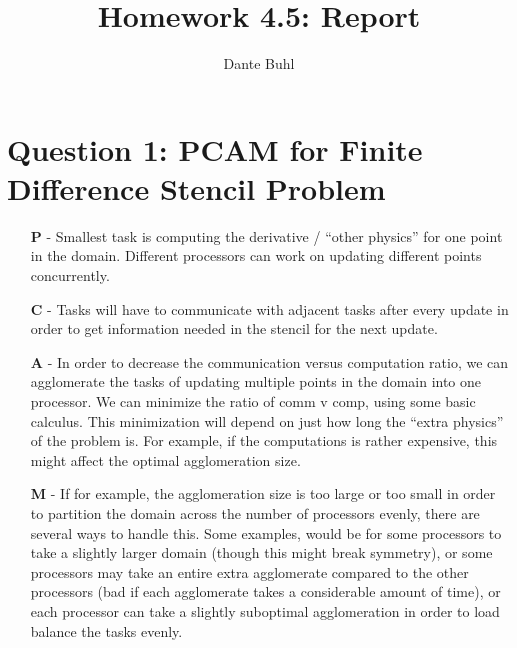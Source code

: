 \documentclass{article}
\title{Homework 4.5: Report}
\author{Dante Buhl}
\begin{document}
\newcommand{\bs}[1]{\boldsymbol{#1}}
\newcommand{\bmp}[1]{\begin{minipage}{#1\textwidth}}
\newcommand{\emp}{\end{minipage}}
\newcommand{\R}{\mathbb{R}}
\newcommand{\C}{\mathbb{C}}
\newcommand{\N}{\mathcal{N}}
\newcommand{\I}{\mathrm{I}}
\newcommand{\K}{\bs{\mathrm{K}}}
\newcommand{\m}{\bs{\mu}_*}
\newcommand{\s}{\bs{\Sigma}_*}
\newcommand{\dt}{\Delta t}
\newcommand{\tr}[1]{\text{Tr}(#1)}
\newcommand{\Tr}[1]{\text{Tr}(#1)}

\maketitle

\section*{Question 1: PCAM for Finite Difference Stencil Problem}
\begin{enumerate}

    \item[\textbf{P} -] Smallest task is computing the derivative / ``other
    physics'' for one point in the domain. Different processors can work on
    updating different points concurrently.   
               
    \item[\textbf{C} -] Tasks will have to communicate with adjacent tasks after every
    update in order to get information needed in the stencil for the next
    update.
               
    \item[\textbf{A} -] In order to decrease the communication versus
    computation ratio, we can agglomerate the tasks of updating multiple points
    in the domain into one processor. We can minimize the ratio of comm v comp,
    using some basic calculus. This minimization will depend on just how long
    the ``extra physics'' of the problem is. For example, if the computations is
    rather expensive, this might affect the optimal agglomeration size. 
               
    \item[\textbf{M} -] If for example, the agglomeration size is too large or
    too small in order to partition the domain across the number of processors
    evenly, there are several ways to handle this. Some examples, would be for
    some processors to take a slightly larger domain (though this might break
    symmetry), or some processors may take an entire extra agglomerate compared
    to the other processors (bad if each agglomerate takes a considerable
    amount of time), or each processor can take a slightly suboptimal
    agglomeration in order to load balance the tasks evenly. 
               
\end{enumerate}
               
\end{document}
